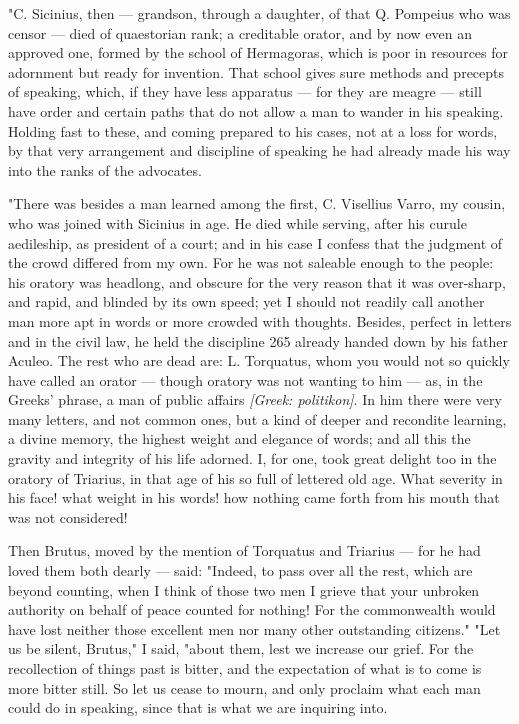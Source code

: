  "C. Sicinius, then — grandson, through a daughter, of that Q. Pompeius who was censor — died of quaestorian rank; a creditable orator, and by now even an approved one, formed by the school of Hermagoras, which is poor in resources for adornment but ready for invention. That school gives sure methods and precepts of speaking, which, if they have less apparatus — for they are meagre — still have order and certain paths that do not allow a man to wander in his speaking. Holding fast to these, and coming prepared to his cases, not at a loss for words, by that very arrangement and discipline of speaking he had already made his way into the ranks of the advocates.

 "There was besides a man learned among the first, C. Visellius Varro, my cousin, who was joined with Sicinius in age. He died while serving, after his curule aedileship, as president of a court; and in his case I confess that the judgment of the crowd differed from my own. For he was not saleable enough to the people: his oratory was headlong, and obscure for the very reason that it was over-sharp, and rapid, and blinded by its own speed; yet I should not readily call another man more apt in words or more crowded with thoughts. Besides, perfect in letters and in the civil law, he held the discipline 265 already handed down by his father Aculeo. The rest who are dead are: L. Torquatus, whom you would not so quickly have called an orator — though oratory was not wanting to him — as, in the Greeks' phrase, a man of public affairs \textit{[Greek: politikon]}. In him there were very many letters, and not common ones, but a kind of deeper and recondite learning, a divine memory, the highest weight and elegance of words; and all this the gravity and integrity of his life adorned. I, for one, took great delight too in the oratory of Triarius, in that age of his so full of lettered old age. What severity in his face! what weight in his words! how nothing came forth from his mouth that was not considered!

 Then Brutus, moved by the mention of Torquatus and Triarius — for he had loved them both dearly — said: "Indeed, to pass over all the rest, which are beyond counting, when I think of those two men I grieve that your unbroken authority on behalf of peace counted for nothing! For the commonwealth would have lost neither those excellent men nor many other outstanding citizens." "Let us be silent, Brutus," I said, "about them, lest we increase our grief. For the recollection of things past is bitter, and the expectation of what is to come is more bitter still. So let us cease to mourn, and only proclaim what each man could do in speaking, since that is what we are inquiring into.

